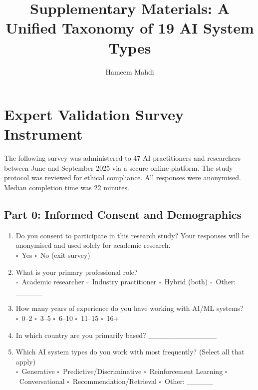 \documentclass[acmlarge]{acmart}
\begin{document}
\title{Supplementary Materials: A Unified Taxonomy of 19 AI System Types}
\author{Hameem Mahdi}

\maketitle

\appendix
\section{Expert Validation Survey Instrument}
\label{app:survey}

The following survey was administered to 47 AI practitioners and researchers between June and September 2025 via a secure online platform. The study protocol was reviewed for ethical compliance. All responses were anonymised. Median completion time was 22 minutes.

\subsection{Part 0: Informed Consent and Demographics}

\begin{enumerate}
  \item[\textbf{Q0.1}] Do you consent to participate in this research study? Your responses will be anonymised and used solely for academic research.\\
  $\square$~Yes \quad $\square$~No (exit survey)

  \item[\textbf{Q0.2}] What is your primary professional role?\\
  $\square$~Academic researcher \quad $\square$~Industry practitioner \quad $\square$~Hybrid (both) \quad $\square$~Other: \_\_\_\_\_

  \item[\textbf{Q0.3}] How many years of experience do you have working with AI/ML systems?\\
  $\square$~0--2 \quad $\square$~3--5 \quad $\square$~6--10 \quad $\square$~11--15 \quad $\square$~16+

  \item[\textbf{Q0.4}] In which country are you primarily based? \_\_\_\_\_\_\_\_\_\_\_\_\_

  \item[\textbf{Q0.5}] Which AI system types do you work with most frequently? (Select all that apply)\\
  $\square$~Generative \quad $\square$~Predictive/Discriminative \quad $\square$~Reinforcement Learning \quad $\square$~Conversational \quad $\square$~Recommendation/Retrieval \quad $\square$~Other: \_\_\_\_\_
\end{enumerate}
\end{document}
